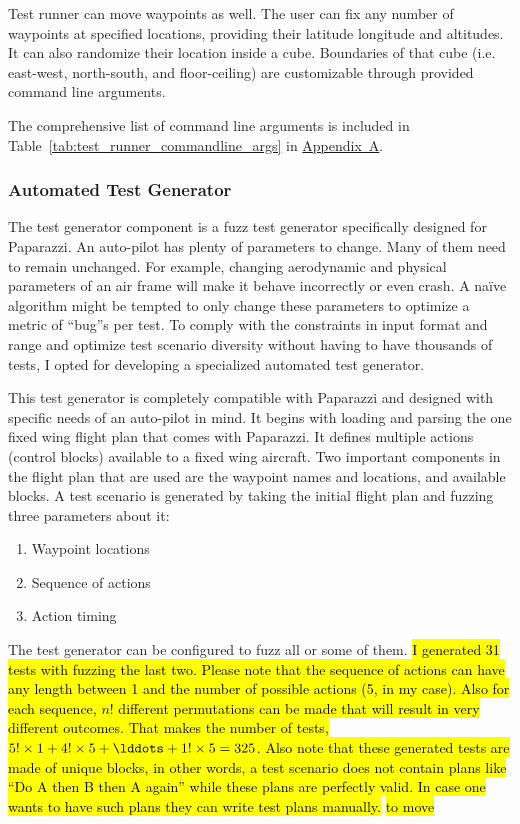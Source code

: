 Test runner can move waypoints as well. The user can fix any number of waypoints at specified locations, providing their latitude longitude and altitudes. It can also randomize their location inside a cube. Boundaries of that cube (i.e. east-west, north-south, and floor-ceiling) are customizable through provided command line arguments.

The comprehensive list of command line arguments is included in Table~\ref{tab:test_runner_commandline_args} in \hyperref[appendixa]{Appendix~A}.


\subsubsection{Automated Test Generator}
The test generator component is a fuzz test generator specifically designed for Paparazzi. An auto-pilot has plenty of parameters to change. Many of them need to remain unchanged. For example, changing aerodynamic and physical parameters of an air frame will make it behave incorrectly or even crash. A naïve algorithm might be tempted to only change these parameters to optimize a metric of ``bug''s per test. To comply with the constraints in input format and range and optimize test scenario diversity without having to have thousands of tests, I opted for developing a specialized automated test generator. 

This test generator is completely compatible with Paparazzi and designed with specific needs of an auto-pilot in mind. It begins with loading and parsing the one fixed wing flight plan that comes with Paparazzi. It defines multiple actions (control blocks) available to a fixed wing aircraft. Two important components in the flight plan that are used are the waypoint names and locations, and available blocks. A test scenario is generated by taking the initial flight plan and fuzzing three parameters about it:
\begin{enumerate}
    \item Waypoint locations
    \item Sequence of actions 
    \item Action timing
\end{enumerate}

The test generator can be configured to fuzz all or some of them. \hl{I generated 31 tests with fuzzing the last two. Please note that the sequence of actions can have any length between 1 and the number of possible actions (5, in my case). Also for each sequence, $n!$ different permutations can be made that will result in very different outcomes. That makes the number of tests, $5!\times1+4!\times5+\lddots+1!\times5=325$. Also note that these generated tests are made of unique blocks, in other words, a test scenario does not contain plans like ``Do A then B then A again'' while these plans are perfectly valid. In case one wants to have such plans they can write test plans manually.} \hl{to move}

